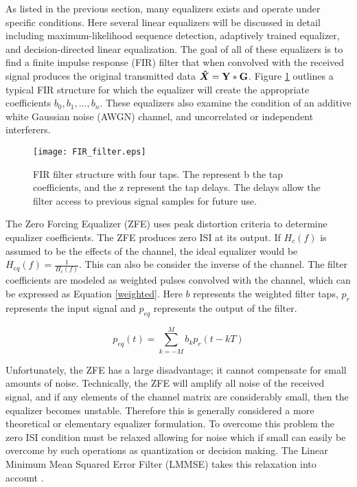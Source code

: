 As listed in the previous section, many equalizers exists and operate under specific conditions.  Here several linear equalizers will be discussed in detail including maximum-likelihood sequence detection, adaptively trained equalizer, and decision-directed linear equalization.  The goal of all of these equalizers is to find a finite impulse response (FIR) filter that when convolved with the received signal produces the original transmitted data \( \boldsymbol{\hat{X}}=\bf{Y} * \bf{G} \).  Figure \ref{FIR_filter} outlines a typical FIR structure for which the equalizer will create the appropriate coefficients \(b_{0},b_{1},..., b_{n} \).  These equalizers also examine the condition of an additive white Gaussian noise (AWGN) channel, and uncorrelated or independent interferers.\\

\begin{figure}[!ht]\label{FIR_filter}
\centering
\texttt{[image: FIR\_filter.eps]}
\caption{FIR filter structure with four taps.  The represent b the tap coefficients, and the z represent the tap delays.  The delays allow the filter access to previous signal samples for future use.}
\end{figure}

The Zero Forcing Equalizer (ZFE) uses peak distortion criteria to determine equalizer coefficients.  The ZFE produces zero ISI at its output.  If \(H_{c}(f)\) is assumed to be the effects of the channel, the ideal equalizer would be \( H_{eq}(f)=\frac{1}{H_{c}(f)}\).  This can also be consider the inverse of the channel.  The filter coefficients are modeled as weighted pulses convolved with the channel, which can be expressed as Equation \eqref{weighted}.  Here \(b\) represents the weighted filter taps, \(p_{r}\) represents the input signal and \(p_{eq}\) represents the output of the filter.

\begin{equation}\label{weighted}
p_{eq}(t) = \displaystyle\sum_{k=-M}^{M} b_{k}p_{r}(t-kT)
\end{equation}

Unfortunately, the ZFE has a large disadvantage; it cannot compensate for small amounts of noise.  Technically, the ZFE will amplify all noise of the received signal, and if any elements of the channel matrix are considerably small, then the equalizer becomes unstable. Therefore this is generally considered a more theoretical or elementary equalizer formulation.  To overcome this problem the zero ISI condition must be relaxed allowing for noise which if small can easily be overcome by such operations as quantization or decision making.  The Linear Minimum Mean Squared Error Filter (LMMSE) takes this relaxation into account \cite{spinger}.\\ 


